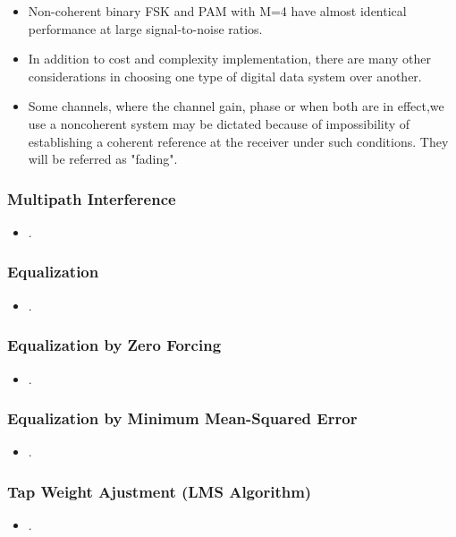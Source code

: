 \documentclass{beamer}
\begin{document}
\begin{frame}
	\begin{itemize}
	\item Non-coherent binary FSK and PAM with M=4 have almost identical performance at large signal-to-noise ratios.
	\item	In addition to cost and complexity implementation, there are many other considerations in choosing one type of digital data system over another.
	\item Some channels, where the channel gain, phase or when both are in effect,we use a noncoherent system may be dictated because of impossibility of establishing a coherent reference at the receiver  under such conditions. They will be referred as "fading".
	\end{itemize}
\end{frame}


\begin{frame}
	\frametitle{Multipath Interference}
	\begin{itemize}
		\item .
	\end{itemize}
\end{frame}


\begin{frame}
	\frametitle{Equalization}
	\begin{itemize}
		\item .
	\end{itemize}
\end{frame}

\begin{frame}
	\frametitle{Equalization by Zero Forcing}
	\begin{itemize}
		\item .
	\end{itemize}
\end{frame}

\begin{frame}
	\frametitle{Equalization by Minimum Mean-Squared Error}
	\begin{itemize}
		\item .
	\end{itemize}
\end{frame}

\begin{frame}
	\frametitle{Tap Weight Ajustment (LMS Algorithm)}
	\begin{itemize}
		\item .
	\end{itemize}
\end{frame}
\end{document}
